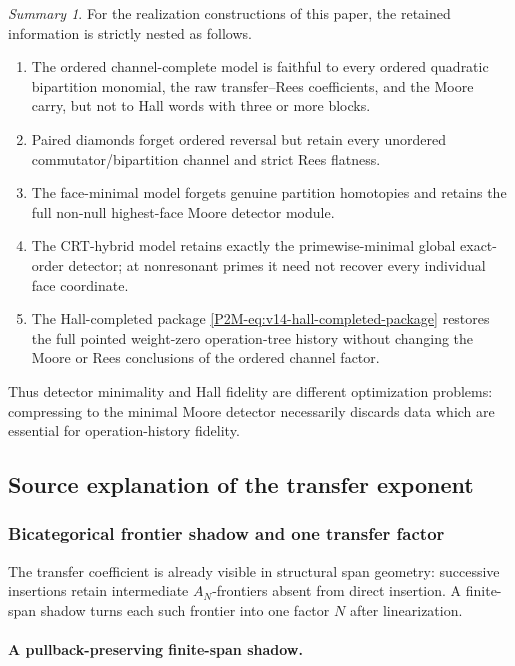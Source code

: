 \documentclass[11pt]{article}
\theoremstyle{remark}
\newtheorem*{summary}{Summary}
\begin{document}
\begin{summary}
For the realization constructions of this paper, the retained information is
strictly nested as follows.
\begin{enumerate}[label=\textup{(\alph*)}]
\item The ordered channel-complete model is faithful to every ordered quadratic
      bipartition monomial, the raw transfer--Rees coefficients, and the Moore
      carry, but not to Hall words with three or more blocks.
\item Paired diamonds forget ordered reversal but retain every unordered
      commutator/bipartition channel and strict Rees flatness.
\item The face-minimal model forgets genuine partition homotopies and retains
      the full non-null highest-face Moore detector module.
\item The CRT-hybrid model retains exactly the primewise-minimal global
      exact-order detector; at nonresonant primes it need not recover every
      individual face coordinate.
\item The Hall-completed package
      \eqref{P2M-eq:v14-hall-completed-package} restores the full pointed
      weight-zero operation-tree history without changing the Moore or Rees
      conclusions of the ordered channel factor.
\end{enumerate}
Thus detector minimality and Hall fidelity are different optimization
problems: compressing to the minimal Moore detector necessarily discards data
which are essential for operation-history fidelity.
\end{summary}


\subsection{Source explanation of the transfer exponent}

\subsubsection{Bicategorical frontier shadow and one transfer factor}

The transfer coefficient is already visible in structural span geometry:
successive insertions retain intermediate \(A_N\)-frontiers absent from direct
insertion.  A finite-span shadow turns each such frontier into one factor
\(N\) after linearization.

\paragraph{A pullback-preserving finite-span shadow.}
\end{document}
